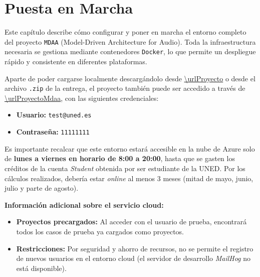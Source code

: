 \chapter{Puesta en Marcha}
\label{cap:puesta-en-marcha}

Este capítulo describe cómo configurar y poner en marcha el entorno completo del proyecto \texttt{MDAA} (Model-Driven Architecture for Audio). Toda la infraestructura necesaria se gestiona mediante contenedores \texttt{Docker}, lo que permite un despliegue rápido y consistente en diferentes plataformas.

\begin{tcolorbox}[colback=blue!5,colframe=blue!75!black,title=Nota informativa: Acceso Directo y Credenciales]
Aparte de poder cargarse localmente descargándolo desde \url{\urlProyecto} o desde el archivo \texttt{.zip} de la entrega, el proyecto también puede ser accedido a través de \url{\urlProyectoMdaa}, con las siguientes credenciales:
\begin{itemize}
    \item \textbf{Usuario:} \texttt{test@uned.es}
    \item \textbf{Contraseña:} \texttt{11111111}
\end{itemize}

Es importante recalcar que este entorno estará accesible en la nube de Azure solo de \textbf{lunes a viernes en horario de 8:00 a 20:00}, hasta que se gasten los créditos de la cuenta \textit{Student} obtenida por ser estudiante de la UNED. Por los cálculos realizados, debería estar \textit{online} al menos 3 meses (mitad de mayo, junio, julio y parte de agosto).

\textbf{Información adicional sobre el servicio cloud:}
\begin{itemize}
    \item \textbf{Proyectos precargados:} Al acceder con el usuario de prueba, encontrará todos los casos de prueba ya cargados como proyectos.
    \item \textbf{Restricciones:} Por seguridad y ahorro de recursos, no se permite el registro de nuevos usuarios en el entorno cloud (el servidor de desarrollo \textit{MailHog} no está disponible).
\end{itemize}
\end{tcolorbox}

